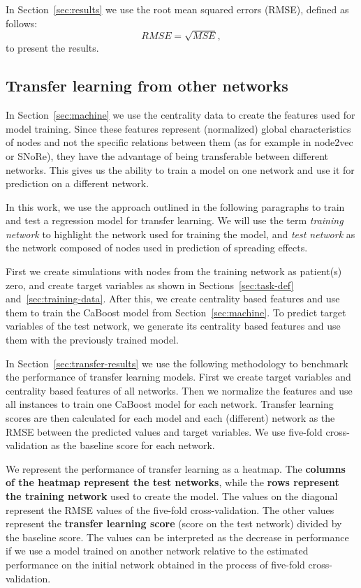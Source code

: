 \documentclass{article}
\begin{document}
In Section~\ref{sec:results} we use the root mean squared errors (RMSE), defined as follows:
\begin{equation*}
    RMSE = \sqrt{MSE},
\end{equation*}
\noindent to present the results.

\subsection{Transfer learning from other networks}
In Section~\ref{sec:machine} we use the centrality data to create the features used for model training. Since these features represent (normalized) global characteristics of nodes and not the specific relations between them (as for example in node2vec or SNoRe), they have the advantage of being transferable between different networks. This gives us the ability to train a model on one network and use it for prediction on a different network.

In this work, we use the approach outlined in the following paragraphs to train and test a regression model for transfer learning. We will use the term \emph{training network} to highlight the network used for training the model, and \emph{test network} as the network composed of nodes used in prediction of spreading effects.

First we create simulations with nodes from the training network as patient(s) zero, and create target variables as shown in Sections~\ref{sec:task-def} and~\ref{sec:training-data}. After this, we create centrality based features and use them to train the CaBoost model from Section~\ref{sec:machine}. To predict target variables of the test network, we generate its centrality based features and use them with the previously trained model.

In Section~\ref{sec:transfer-results} we use the following methodology to benchmark the performance of transfer learning models. First we create target variables and centrality based features of all networks. Then we normalize the features and use all instances to train one CaBoost model for each network. Transfer learning scores are then calculated for each model and each (different) network as the RMSE between the predicted values and target variables. We use five-fold cross-validation as the baseline score for each network.

We represent the performance of transfer learning as a heatmap. The \textbf{columns of the heatmap represent the test networks}, while the \textbf{rows represent the training network} used to create the model. The values on the diagonal represent the RMSE values of the five-fold cross-validation. The other values represent the \textbf{transfer learning score} (score on the test network) divided by the baseline score. The values can be interpreted as the decrease in performance if we use a model trained on another network relative to the estimated performance on the initial network obtained in the process of five-fold cross-validation.
\end{document}
